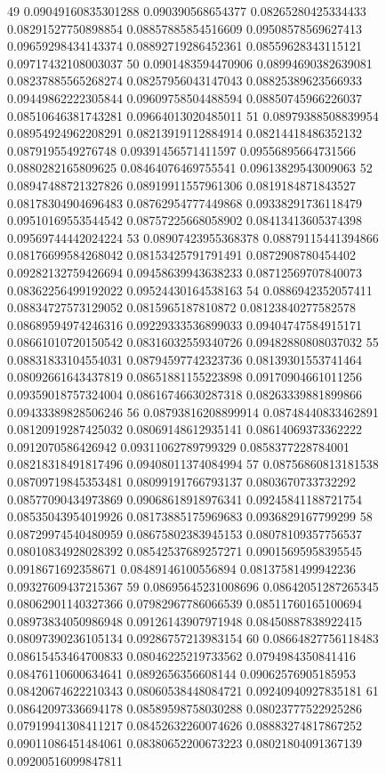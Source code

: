 49 0.09049160835301288 0.090390568654377 0.08265280425334433 0.08291527750898854 0.08857885854516609 0.09508578569627413 0.09659298434143374 0.08892719286452361 0.08559628343115121 0.09717432108003037
50 0.0901483594470906 0.08994690382639081 0.08237885565268274 0.08257956043147043 0.08825389623566933 0.09449862222305844 0.09609758504488594 0.08850745966226037 0.08510646381743281 0.09664013020485011
51 0.08979388508839954 0.08954924962208291 0.08213919112884914 0.08214418486352132 0.0879195549276748 0.09391456571411597 0.09556895664731566 0.0880282165809625 0.08464076469755541 0.09613829543009063
52 0.08947488721327826 0.08919911557961306 0.0819184871843527 0.08178304904696483 0.08762954777449868 0.09338291736118479 0.09510169553544542 0.08757225668058902 0.08413413605374398 0.09569744442024224
53 0.08907423955368378 0.08879115441394866 0.08176699584268042 0.08153425791791491 0.0872908780454402 0.09282132759426694 0.09458639943638233 0.08712569707840073 0.08362256499192022 0.09524430164538163
54 0.0886942352057411 0.08834727573129052 0.0815965187810872 0.08123840277582578 0.08689594974246316 0.09229333536899033 0.09404747584915171 0.08661010720150542 0.08316032559340726 0.09482880808037032
55 0.08831833104554031 0.08794597742323736 0.08139301553741464 0.08092661643437819 0.08651881155223898 0.09170904661011256 0.09359018757324004 0.08616746630287318 0.08263339881899866 0.09433389828506246
56 0.08793816208899914 0.08748440833462891 0.08120919287425032 0.08069148612935141 0.08614069373362222 0.0912070586426942 0.09311062789799329 0.0858377228784001 0.08218318491817496 0.09408011374084994
57 0.08756860813181538 0.08709719845353481 0.08099191766793137 0.0803670733732292 0.08577090434973869 0.09068618918976341 0.09245841188721754 0.08535043954019926 0.08173885175969683 0.0936829167799299
58 0.08729974540480959 0.08675802383945153 0.08078109357756537 0.08010834928028392 0.08542537689257271 0.09015695958395545 0.0918671692358671 0.08489146100556894 0.08137581499942236 0.09327609437215367
59 0.08695645231008696 0.08642051287265345 0.08062901140327366 0.07982967786066539 0.08511760165100694 0.08973834050986948 0.09126143907971948 0.08450887838922415 0.08097390236105134 0.09286757213983154
60 0.08664827756118483 0.08615453464700833 0.08046225219733562 0.0794984350841416 0.08476110600634641 0.0892656356608144 0.09062576905185953 0.08420674622210343 0.08060538448084721 0.09240940927835181
61 0.08642097336694178 0.08589598758030288 0.08023777522925286 0.07919941308411217 0.08452632260074626 0.08883274817867252 0.09011086451484061 0.08380652200673223 0.08021804091367139 0.09200516099847811
